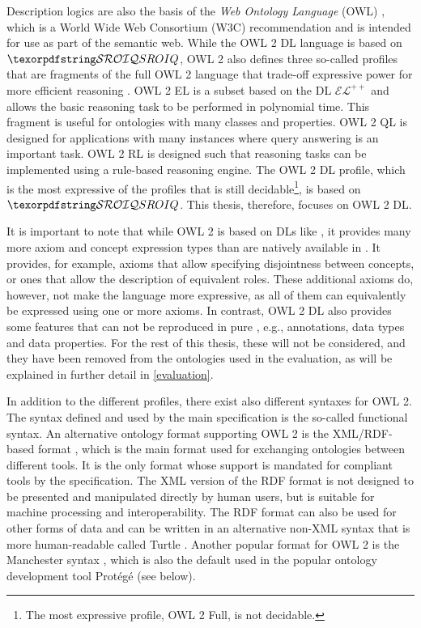 
Description logics are also the basis of the \emph{Web Ontology Language} (OWL) \cite{hitzler2012primer,motik2012ontology}, which is a World Wide Web Consortium (W3C) recommendation and is intended for use as part of the semantic web. While the OWL 2 DL language is based on $\SROIQ$, OWL 2 also defines three so-called profiles that are fragments of the full OWL 2 language that trade-off expressive power for more efficient reasoning \cite{motik2012profiles,motik2012ontology}. OWL 2 EL is a subset based on the DL $\mathcal{EL}^{++}$ and allows the basic reasoning task to be performed in polynomial time. This fragment is useful for ontologies with many classes and properties. OWL 2 QL is designed for applications with many instances where query answering is an important task. OWL 2 RL is designed such that reasoning tasks can be implemented using a rule-based reasoning engine. The OWL 2 DL profile, which is the most expressive of the profiles that is still decidable\footnote{The most expressive profile, OWL 2 Full, is not decidable.}, is based on $\SROIQ$. This thesis, therefore, focuses on OWL 2 DL.

It is important to note that while OWL 2 is based on DLs like \SROIQ, it provides many more axiom and concept expression types than are natively available in \SROIQ. It provides, for example, axioms that allow specifying disjointness between concepts, or ones that allow the description of equivalent roles. These additional axioms do, however, not make the language more expressive, as all of them can equivalently be expressed using one or more \SROIQ axioms. In contrast, OWL 2 DL also provides some features that can not be reproduced in pure \SROIQ, e.g., annotations, data types and data properties. For the rest of this thesis, these will not be considered, and they have been removed from the ontologies used in the evaluation, as will be explained in further detail in \cref{evaluation}.

In addition to the different profiles, there exist also different syntaxes for OWL 2. The syntax defined and used by the main specification \cite{motik2012ontology} is the so-called functional syntax. An alternative ontology format supporting OWL 2 is the XML/RDF-based format \cite{beckett2004rdf,motik2009rdf}, which is the main format used for exchanging ontologies between different tools. It is the only format whose support is mandated for compliant tools by the specification. The XML version of the RDF format is not designed to be presented and manipulated directly by human users, but is suitable for machine processing and interoperability. The RDF format can also be used for other forms of data and can be written in an alternative non-XML syntax that is more human-readable called Turtle \cite{beckett2008turtle}. Another popular format for OWL 2 is the Manchester syntax \cite{horridge2009manchester}, which is also the default used in the popular ontology development tool Protégé (see below).

